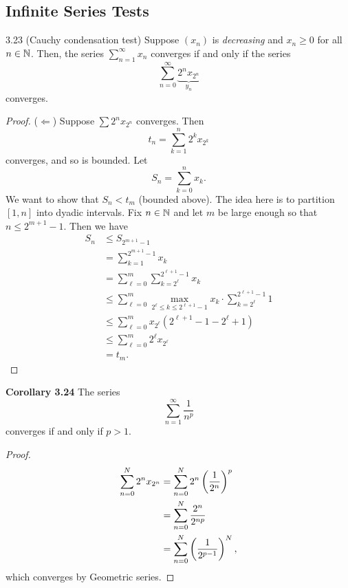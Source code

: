 \documentclass[class=article, crop=false]{standalone}
\begin{document}
  \subsection{Infinite Series Tests}
  \begin{theorem}{3.23 (Cauchy condensation test)}
    Suppose $(x_n)$ is \emph{decreasing} and $x_n\geq 0$ for all $n\in\mathbb{N}$. Then, the series $\sum_{n=1}^{\infty} x_n$ converges if and only if the series
    \[
      \sum_{n=0}^{\infty}\underbrace{2^n x_{2^n}}_{y_n}
    \]
    converges.
    \begin{proof}
      ($\Leftarrow$) Suppose $\sum 2^n x_{2^n}$ converges. Then
      \[
        t_n = \sum_{k=1}^{n} 2^kx_{2^k}
      \]
      converges, and so is bounded. Let
      \[
        S_n = \sum_{k=0}^{n} x_k. 
      \]
      We want to show that $S_n < t_m$ (bounded above). The idea here is to partition $[1, n]$ into dyadic intervals. Fix $n\in\mathbb{N}$ and let $m$ be large enough so that $n\leq 2^{m + 1} - 1$. Then we have
      \begin{align*}
        S_n &\leq S_{2^{m + 1} - 1} \\
            &= \sum_{k=1}^{2^{m + 1} - 1}x_k \\
            &= \sum_{\ell=0}^{m} \sum_{k=2^\ell}^{2^{\ell + 1} - 1}x_k \\
            &\leq \sum_{\ell=0}^{m} \max_{2^\ell\leq k\leq 2^{\ell + 1} - 1} x_k \cdot \sum_{k=2^\ell}^{2^{\ell + 1} - 1}1 \\
            &\leq \sum_{\ell=0}^{m} x_{2^\ell} (2^{\ell + 1} - 1 - 2^\ell + 1) \\
            &\leq \sum_{\ell=0}^{m}2^\ell x_{2^\ell} \\
            &= t_m.
      \end{align*}
    \end{proof}
  \end{theorem}
  \textbf{Corollary 3.24} The series
  \[
    \sum_{n=1}^{\infty} \frac{1}{n^p}
  \]
  converges if and only if $p > 1$.
  \begin{proof}
    \begin{align*}
      \sum_{n=0}^{N} 2^nx_{2^n} &= \sum_{n=0}^{N}2^n \left( \frac{1}{2^n} \right)^p \\
                                &= \sum_{n=0}^{N} \frac{2^n}{2^{np}} \\
                                &= \sum_{n=0}^{N} \left( \frac{1}{2^{p - 1}} \right)^N,
    \end{align*}
    which converges by Geometric series.
  \end{proof}
\end{document}
